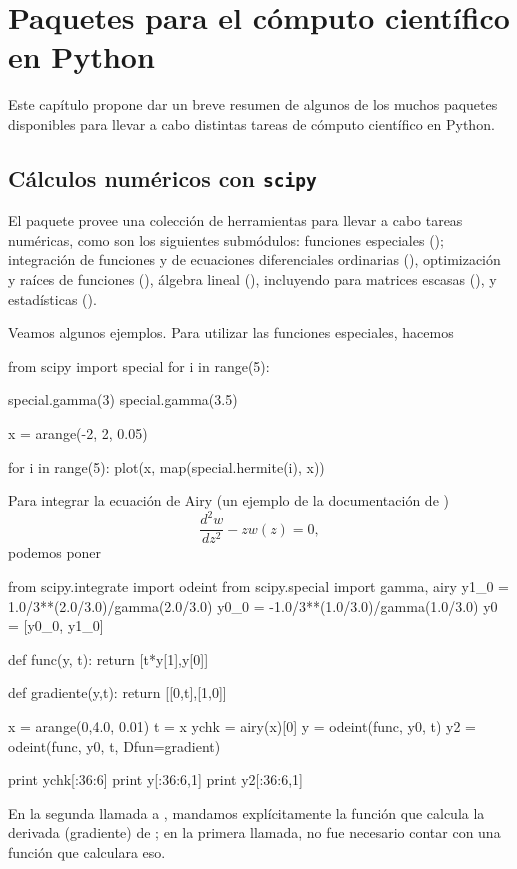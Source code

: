 \chapter{Paquetes para el cómputo científico en Python}

Este capítulo propone dar un breve resumen de algunos de los muchos paquetes disponibles para llevar a cabo distintas tareas de cómputo científico en Python.

\section{Cálculos numéricos con \texttt{scipy}}
El paquete  provee una colección de herramientas para llevar a cabo tareas numéricas, como son los siguientes submódulos:
funciones especiales (); integración de funciones  y de ecuaciones diferenciales ordinarias (), optimización y raíces de funciones (), álgebra lineal (), incluyendo para matrices escasas (), y estadísticas ().

Veamos algunos ejemplos. Para utilizar las funciones especiales, hacemos
\begin{python}
from scipy import special
for i in range(5):


special.gamma(3)
special.gamma(3.5)

x = arange(-2, 2, 0.05)

for i in range(5):
  plot(x, map(special.hermite(i), x))
\end{python}

Para integrar la ecuación de Airy (un ejemplo de la documentación de )
\begin{equation}
\frac{d^2 w}{d z^2} - z w(z) = 0,
\end{equation}
podemos poner
\begin{python}
from scipy.integrate import odeint
from scipy.special import gamma, airy
y1_0 = 1.0/3**(2.0/3.0)/gamma(2.0/3.0)
y0_0 = -1.0/3**(1.0/3.0)/gamma(1.0/3.0)
y0 = [y0_0, y1_0]

def func(y, t):
  return [t*y[1],y[0]]

def gradiente(y,t):
  return [[0,t],[1,0]]

x = arange(0,4.0, 0.01)
t = x
ychk = airy(x)[0]
y = odeint(func, y0, t)
y2 = odeint(func, y0, t, Dfun=gradient)

print ychk[:36:6]
print y[:36:6,1]
print y2[:36:6,1]
\end{python}
En la segunda llamada a , mandamos explícitamente la función que calcula la derivada (gradiente) de ; en la primera llamada, no fue necesario contar con una función que calculara eso.


